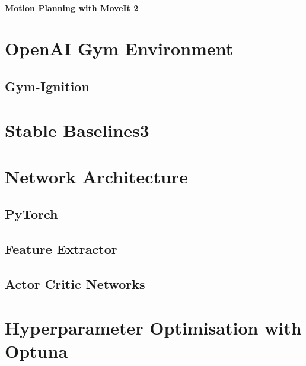 \paragraph{Motion Planning with MoveIt 2}


\section{OpenAI Gym Environment}

\subsection{Gym-Ignition}


\section{Stable Baselines3}


\section{Network Architecture}

\subsection{PyTorch}

\subsection{Feature Extractor}

\subsection{Actor Critic Networks}


\section{Hyperparameter Optimisation with Optuna}
